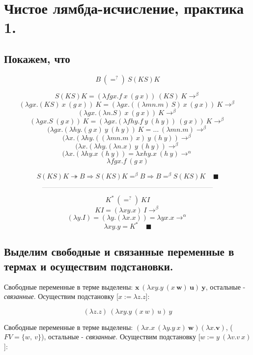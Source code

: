 \documentclass[a4paper,12pt]{article}
\theoremstyle{plain} %
\theoremstyle{definition} %
\theoremstyle{remark} %
\begin{document}
\section{Чистое лямбда-исчисление, практика 1.}
\subsection{Покажем, что}

$$B \ \left(=^{?}\right) \ S(KS)K$$

$$S(KS)K = (\lambda fgx.f \ x \ (g \ x) ) \ (KS) \ K \rightarrow^{\beta}$$
$$(\lambda gx.(KS) \ x \ (g \ x)) \ K = (\lambda gx.((\lambda m n. m) \ S) \ x \ (g \ x)) \ K \rightarrow^{\beta}$$
$$(\lambda gx.(\lambda n. S) \ x \ (g \ x)) \ K \rightarrow^{\beta}$$
$$(\lambda gx. S \ (g \ x)) \ K = (\lambda gx.  (\lambda f  h y. f  \ y \ (h \ y)) \ (g \ x)) \ K  \rightarrow^{\beta} $$
$$(\lambda gx.  (\lambda h y. (g \ x)  \ y \ (h \ y))  \ K  = \dots  \ (\lambda m n. m) \rightarrow^{\beta}$$
$$(\lambda x.  (\lambda h y. ((\lambda m n. m) \ x)  \ y \ (h \ y)) \rightarrow^{\beta}$$
$$(\lambda x.  (\lambda h y. (\lambda n. x)  \ y \ (h \ y)) \rightarrow^{\beta}$$
$$(\lambda x.  (\lambda h y. x \ (h \ y)) = \lambda xhy.x \ (h \ y) \rightarrow^{\alpha}$$
$$\lambda fgx.f \ (g \ x)$$

$$S(KS)K \twoheadrightarrow B \Rightarrow S(KS)K =^{\beta} B \Rightarrow B =^{\beta} S(KS)K \ \ \ \ \ \blacksquare $$

$$\rule{25em}{0.01em}$$

$$K^{*} \ \left(=^{?}\right) \ KI$$
$$KI = (\lambda x y. x) \ I \rightarrow^{\beta}$$
$$(\lambda y. I) = (\lambda y. (\lambda x. x)) = \lambda y x. x \rightarrow^{\alpha}$$
$$\lambda x y. y = K^* \ \ \ \ \ \blacksquare$$

\subsection{Выделим свободные и связанные переменные в термах и осуществим подстановки.}

Свободные переменные в терме выделены: $\boldsymbol{x} \ (\lambda x y. y \ (x \ \boldsymbol{w}) \ \boldsymbol{u}) \ \boldsymbol{y}$, остальные - \textit{связанные}. Осуществим подстановку [$x := \lambda z. z$]:

$$ (\lambda z. z) \ (\lambda x y. y \ (x \ w) \ u) \ y $$

Свободные переменные в терме выделены: $(\lambda x. x \ (\lambda y. y \ x) \ \boldsymbol{w}) (\lambda x. \boldsymbol{v})$, ($FV = \{w, \ v\}$), остальные - \textit{связанные}. Осуществим подстановку [$w := y \ (\lambda v. v \ x)$]:
\end{document}
